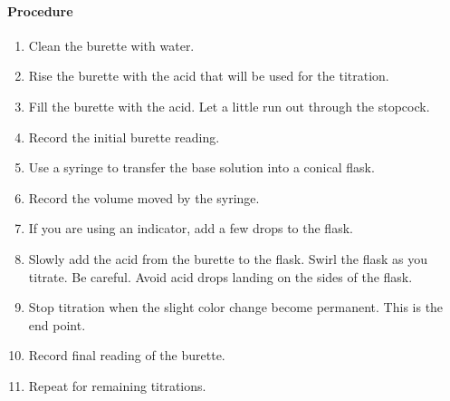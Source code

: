 \paragraph{Procedure}
\begin{enumerate}
\item Clean the burette with water.
\item Rise the burette with the acid that will be used for the titration.
\item Fill the burette with the acid. Let a little run out through the stopcock.
\item Record the initial burette reading.
\item Use a syringe to transfer the base solution into a conical flask.
\item Record the volume moved by the syringe.
\item If you are using an indicator, add a few drops to the flask.
\item Slowly add the acid from the burette to the flask. Swirl the flask as you titrate. Be careful. Avoid acid drops landing on the sides of the flask.
\item Stop titration when the slight color change become permanent. This is the end point.
\item Record final reading of the burette.
\item Repeat for remaining titrations.
\end{enumerate}

